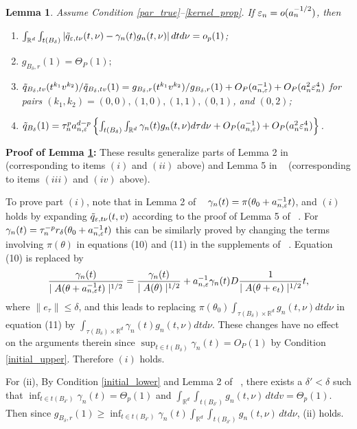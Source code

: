 \documentclass{article}
\newtheorem{lemma}{Lemma}
\begin{document}
\begin{lemma}\label{Alemma2} Assume Condition \ref{par_true}--\ref{kernel_prop}. If $\varepsilon_{n}=o(a_{n}^{-1/2})$, then 
	\begin{enumerate}
		\item[(i)] $\int_{\mathbb{R}^{d}}\int_{t(B_{\delta})}|\tilde{q}_{\varepsilon,t\nu}(t,\nu)-\gamma_{n}(t)g_{n}(t,\nu)|\,dtd\nu=o_{p}(1)$;
		\item[(ii)] $g_{B_{\delta},r}(1)=\Theta_{P}(1);$ 
		\item[(iii)] $\tilde{q}_{B_{\delta},tv}(t^{k_{1}}v^{k_{2}})/\tilde{q}_{B_{\delta},tv}(1)=g_{B_{\delta},r}(t^{k_{1}}v^{k_{2}})/g_{B_{\delta},r}(1)+O_{P}(a_{n,\varepsilon}^{-1})+O_{P}(a_{n}^{2}\varepsilon_{n}^{4})$
		for pairs $(k_{1}, k_{2}) = (0,0), (1,0), (1,1), (0,1)$, and $(0,2)$; 
		\item[(iv)] $\tilde{q}_{B_{\delta}}(1)=\tau_{n}^{p}a_{n,\varepsilon}^{d-p}\left\{ \int_{t(B_{\delta})}\int_{\mathbb{R}^{d}}\gamma_{n}(t)g_{n}(t,\nu)d\tau d\nu+O_{P}(a_{n,\varepsilon}^{-1})+O_{P}(a_{n}^{2}\varepsilon_{n}^{4})\right\} $. 
	\end{enumerate}\end{lemma}
{\bf Proof of Lemma \ref{Alemma2}:} 
	These results generalize parts of Lemma 2 in ~\cite{Li2017} (corresponding to items $(i)$ and $(ii)$ above) and Lemma 5 in
	~\cite{Li2016} (corresponding to items $(iii)$ and $(iv)$ above). 
	
	To prove part $(i)$, note that in Lemma 2 of ~\cite{Li2017}  $\gamma_{n}(t)=\pi(\theta_0+a_{n,\varepsilon}^{-1}t)$,
	and $(i)$ holds by expanding $\tilde{q}_{\varepsilon,t\nu}(t,v)$ according to
	the proof of Lemma 5 of ~\cite{Li2016}. 
	For $\gamma_{n}(t)=\tau_{n}^{-p}r_{\delta}(\theta_0+a_{n,\varepsilon}^{-1}t)$ this can be similarly proved by changing the terms involving $\pi(\theta)$ in equations (10) and (11) in the supplements of ~\cite{Li2016}. Equation (10)
	is replaced by 
	\[
	\frac{\gamma_{n}(t)}{\mid A(\theta+a_{n,\varepsilon}^{-1}t)\mid^{1/2}}=\frac{\gamma_{n}(t)}{\mid A(\theta)\mid^{1/2}}+a_{n,\varepsilon}^{-1}\gamma_{n}(t)D\frac{1}{\mid A(\theta+e_{t})\mid^{1/2}}t,
	\]
	where $\|e_{\tau}\|\leq\delta$, and this leads to replacing $\pi(\theta_0)\int_{\tau(B_{\delta})\times\mathbb{R}^{d}}g_{n}(t,\nu)dtd\nu$
	in equation (11) by $\int_{\tau(B_{\delta})\times\mathbb{R}^{d}}\gamma_{n}(t)g_{n}(t,\nu)dtd\nu$.
	These changes have no effect on the arguments therein since $\sup_{t\in t(B_{\delta})}\gamma_{n}(t)=O_{P}(1)$
	by Condition \ref{initial_upper}. Therefore $(i)$ holds.
	
	For (ii), By Condition \ref{initial_lower} and Lemma 2 of ~\cite{Li2017}, there exists a $\delta'<\delta$
	such that $\inf_{t\in t(B_{\delta'})}\gamma_{n}(t)=\Theta_{p}(1)$
	and $\int_{\mathbb{R}^{d}}\int_{t(B_{\delta'})}g_{n}(t,\nu)\,dtdv=\Theta_{p}(1)$.
	Then since $g_{B_{\delta},r}(1)\geq\inf_{t\in t(B_{\delta'})}\gamma_{n}(t)\int_{\mathbb{R}^{d}}\int_{t(B_{\delta'})}g_{n}(t,\nu)\,dtd\nu$,
	(ii) holds.
	
\end{document}
